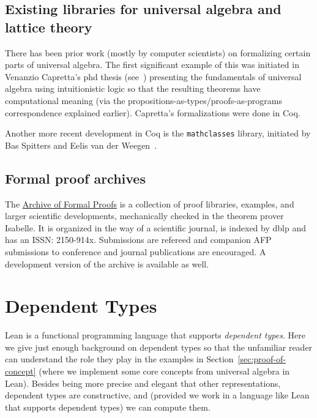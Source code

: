 \documentclass[11pt]{amsart}  %
\begin{document}
\subsection{Existing libraries for universal algebra and lattice theory}
There has been prior work (mostly by computer scientists) on formalizing certain parts of universal algebra. The first significant example of this was initiated in Venanzio Capretta's phd thesis (see~\cite{capretta:1999}) presenting the fundamentals of universal algebra using intuitionistic logic so that the resulting theorems have computational meaning (via the propositions-as-types/proofs-as-programs correspondence explained earlier).  Capretta's formalizations were done in Coq.

Another more recent development in Coq is the {\tt mathclasses} library, initiated by Bas Spitters and Eelis van der Weegen~\cite{MR2678760}. 

\subsection{Formal proof archives}
The \href{https://www.isa-afp.org/}{Archive of Formal Proofs} is a collection of proof libraries, examples, and larger scientific developments, mechanically checked in the theorem prover Isabelle. It is organized in the way of a scientific journal, is indexed by dblp and has an ISSN: 2150-914x.
Submissions are refereed and companion AFP submissions to conference and journal publications are encouraged. A development version of the archive is available as well.









\section{Dependent Types}
Lean is a functional programming language that supports \emph{dependent types}.
Here we give just enough background on dependent types so that the unfamiliar reader can understand the role they play in the examples in Section~\ref{sec:proof-of-concept} (where we implement some core concepts from universal algebra in Lean).
Besides being more precise and elegant that other representations, dependent types are constructive, and (provided we work in a language like Lean that supports dependent types) we can compute them.
\end{document}
